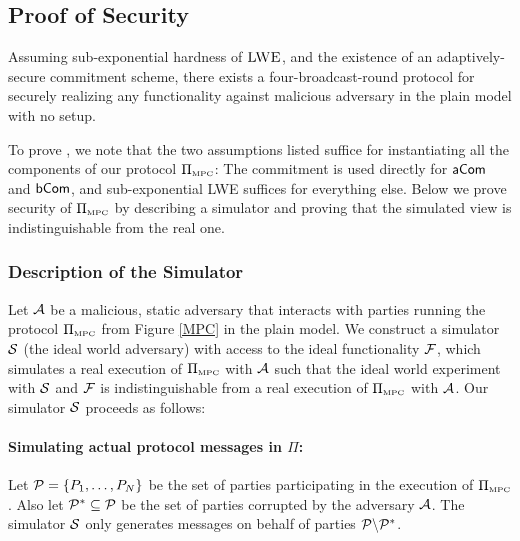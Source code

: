 \subsection{Proof of Security} \label{sec:secProof}
\BT 
Assuming sub-exponential hardness of $\textsc{LWE}$, and the existence of an adaptively-secure commitment scheme, there exists a four-broadcast-round protocol for securely realizing any functionality against malicious adversary in the plain model with no setup.
\label{thm:main}
\ET

To prove , we note that the two assumptions listed suffice for instantiating all the components of our protocol $\Pi_{{\scriptscriptstyle\mathrm{MPC}}}$: The commitment is used directly for $\mathsf{aCom}$ and $\mathsf{bCom}$, and sub-exponential LWE suffices for everything else.
%
Below we prove security of $\Pi_{{\scriptscriptstyle\mathrm{MPC}}}$ by describing a simulator and proving that the simulated view is indistinguishable from the real one.

\subsubsection{Description of the Simulator}\label{sec:simu}

Let ${\cal A}$ be a malicious, static adversary that interacts with parties running the protocol $\Pi_{\scriptscriptstyle\mathrm{MPC}}$ from Figure \ref{MPC} in the plain model. We construct a simulator ${\cal S}$ (the ideal world adversary) with access to the ideal functionality $\mathbf{\mathcal{F}}$, which simulates a real execution of $\Pi_{\scriptscriptstyle\mathrm{MPC}}$ with ${\cal A}$ such that the ideal world experiment with ${\cal S}$ and $\mathbf{\mathcal{F}}$ is indistinguishable from a real execution of $\Pi_{\scriptscriptstyle\mathrm{MPC}}$ with ${\cal A}$. Our simulator ${\cal S}$ proceeds as follows:



\paragraph{Simulating actual protocol messages in $\Pi$:} Let ${\cal P} = \{P_1,\ldots, P_N\}$ be the set of parties participating in the execution of $\Pi_{\scriptscriptstyle\mathrm{MPC}}$. Also let ${\cal P}^* \subseteq {\cal P}$ be the set of parties corrupted by the adversary ${\cal A}$. The simulator ${\cal S}$ only generates messages on behalf of parties ${\cal P}\backslash {\cal P}^*$. %



